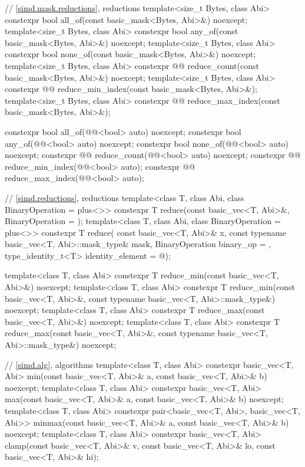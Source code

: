 \begin{codeblock}
{  // \ref{simd.mask.reductions},  reductions
  template<size_t Bytes, class Abi>
    constexpr bool all_of(const basic_mask<Bytes, Abi>&) noexcept;
  template<size_t Bytes, class Abi>
    constexpr bool any_of(const basic_mask<Bytes, Abi>&) noexcept;
  template<size_t Bytes, class Abi>
    constexpr bool none_of(const basic_mask<Bytes, Abi>&) noexcept;
  template<size_t Bytes, class Abi>
    constexpr @@ reduce_count(const basic_mask<Bytes, Abi>&) noexcept;
  template<size_t Bytes, class Abi>
    constexpr @@ reduce_min_index(const basic_mask<Bytes, Abi>&);
  template<size_t Bytes, class Abi>
    constexpr @@ reduce_max_index(const basic_mask<Bytes, Abi>&);

  constexpr bool all_of(@@<bool> auto) noexcept;
  constexpr bool any_of(@@<bool> auto) noexcept;
  constexpr bool none_of(@@<bool> auto) noexcept;
  constexpr @@ reduce_count(@@<bool> auto) noexcept;
  constexpr @@ reduce_min_index(@@<bool> auto);
  constexpr @@ reduce_max_index(@@<bool> auto);

  // \ref{simd.reductions},  reductions
  template<class T, class Abi, class BinaryOperation = plus<>>
    constexpr T reduce(const basic_vec<T, Abi>&, BinaryOperation = {});
  template<class T, class Abi, class BinaryOperation = plus<>>
    constexpr T reduce(
      const basic_vec<T, Abi>& x, const typename basic_vec<T, Abi>::mask_type& mask,
      BinaryOperation binary_op = {}, type_identity_t<T> identity_element = @\seebelow@);

  template<class T, class Abi>
    constexpr T reduce_min(const basic_vec<T, Abi>&) noexcept;
  template<class T, class Abi>
    constexpr T reduce_min(const basic_vec<T, Abi>&,
                           const typename basic_vec<T, Abi>::mask_type&) noexcept;
  template<class T, class Abi>
    constexpr T reduce_max(const basic_vec<T, Abi>&) noexcept;
  template<class T, class Abi>
    constexpr T reduce_max(const basic_vec<T, Abi>&,
                           const typename basic_vec<T, Abi>::mask_type&) noexcept;

  // \ref{simd.alg}, algorithms
  template<class T, class Abi>
    constexpr basic_vec<T, Abi>
      min(const basic_vec<T, Abi>& a, const basic_vec<T, Abi>& b) noexcept;
  template<class T, class Abi>
    constexpr basic_vec<T, Abi>
      max(const basic_vec<T, Abi>& a, const basic_vec<T, Abi>& b) noexcept;
  template<class T, class Abi>
    constexpr pair<basic_vec<T, Abi>, basic_vec<T, Abi>>
      minmax(const basic_vec<T, Abi>& a, const basic_vec<T, Abi>& b) noexcept;
  template<class T, class Abi>
    constexpr basic_vec<T, Abi>
      clamp(const basic_vec<T, Abi>& v, const basic_vec<T, Abi>& lo,
            const basic_vec<T, Abi>& hi);

}
\end{codeblock}
